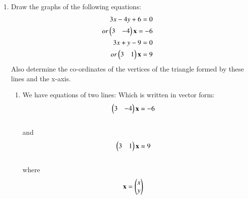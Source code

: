 \documentclass[journal,12pt,twocolumn]{IEEEtran}
\renewcommand\thesection{\arabic{section}}
\begin{document}
\begin{enumerate}[label=\thesection.\arabic*.,ref=\thesection.\theenumi]
\item Draw the graphs of the following equations: 
\begin{align}
    3x-4y+6=0 \\or \begin{pmatrix}3&-4\end{pmatrix}\mathbf{x}=-6\\
3x+y-9=0 \\or \begin{pmatrix}3&1\end{pmatrix}\mathbf{x}=9 
\end{align} 
Also determine the co-ordinates of the vertices of the triangle formed by these lines and the x-axis.\\
\solution\begin{enumerate}
    \item We have equations of two lines:
    Which is written in vector form:
    \begin{align}\label{eq:1}
        \begin{pmatrix}3&-4\end{pmatrix}\mathbf{x}=-6
    \end{align}\\
    and 
    \begin{align}\label{eq:2}
        \begin{pmatrix}3&1\end{pmatrix}\mathbf{x}=9
    \end{align}
\\where \begin{align}
        \mathbf{x}=\begin{pmatrix}x\\y\end{pmatrix}
    \end{align}


\end{enumerate}
\end{enumerate}
\end{document}

